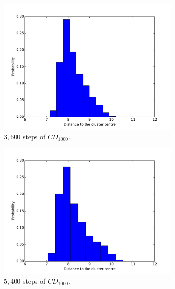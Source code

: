 \begin{figure}[hbt]
\begin{subfigure}[t]{0.18\textwidth}
			\includegraphics[width=\textwidth]{pics_sdbn/cdk_600.pdf}
		    \caption{$3,600$ steps of $CD_{1000}$.}
		\end{subfigure}		
		\begin{subfigure}[t]{0.18\textwidth}
			\includegraphics[width=\textwidth]{pics_sdbn/cdk_900.pdf}
		    \caption{$5,400 $ steps of $CD_{1000}$.}
		\end{subfigure}	
		\begin{subfigure}[t]{0.18\textwidth}

\end{subfigure}
\end{figure}
